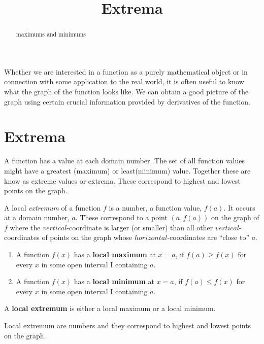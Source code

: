 \documentclass{ximera}
\title{Extrema}
\begin{document}
\begin{abstract}
maximums and minimums
\end{abstract}
\maketitle


Whether we are interested in a function as a purely mathematical
object or in connection with some application to the real world, it is
often useful to know what the graph of the function looks like. We can
obtain a good picture of the graph using certain crucial information
provided by derivatives of the function.

\section{Extrema}

A function has a value at each domain number. The set of all function values might have a greatest (maximum) or least(minimum) value. Together these are know as extreme values or extrema.  These correspond to highest and lowest points on the graph.


A local \textit{extremum} of a function $f$ is a number, a function value, $f(a)$. It occurs at a domain number, $a$. These correspond to a point $(a,f(a))$ on the graph of $f$ where the
$vertical$-coordinate is larger (or smaller) than all other $vertical$-coordinates
 of points on the graph whose $horizontal$-coordinates are ``close to''  $a$. 

\begin{definition}\hfil{}
\begin{enumerate}
\item A function $f(x)$ has a \textbf{local maximum} at $x=a$, if $f(a)\ge
  f(x)$ for every $x$ in some open interval I containing $a$.
\item A function $f(x)$ has a \textbf{local minimum} at $x=a$, if $f(a)\le
  f(x)$ for every $x$  in some open interval I containing $a$.
\end{enumerate}
A \textbf{local extremum} is either a local
maximum or a local minimum.
\end{definition}

Local extremum are numbers and they correspond to highest and lowest points on the graph.
\end{document}
